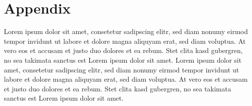 %
%

\newpage

\appendix

\section{Appendix} 
\label{sec:appendix}
Lorem ipsum dolor sit amet, consetetur sadipscing elitr, sed diam nonumy eirmod tempor invidunt ut labore et dolore magna aliquyam erat, sed diam voluptua. At vero eos et accusam et justo duo dolores et ea rebum. Stet clita kasd gubergren, no sea takimata sanctus est Lorem ipsum dolor sit amet. Lorem ipsum dolor sit amet, consetetur sadipscing elitr, sed diam nonumy eirmod tempor invidunt ut labore et dolore magna aliquyam erat, sed diam voluptua. At vero eos et accusam et justo duo dolores et ea rebum. Stet clita kasd gubergren, no sea takimata sanctus est Lorem ipsum dolor sit amet.



%

\newpage



%
%
%
%
%
%


%

%

